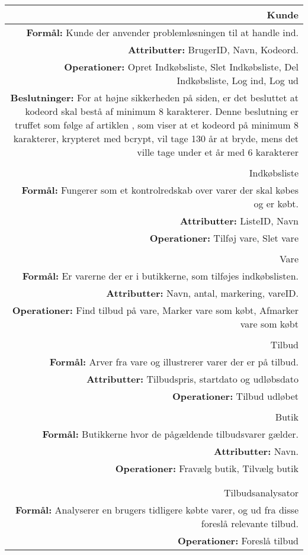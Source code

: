 \begin{table}[H]
\begin{tabularx}{\textwidth}{R}
\hline
Kunde \\ \hline
\textbf{Formål:} Kunde der anvender problemløsningen til at handle ind. \\ 
\textbf{Attributter:} BrugerID, Navn, Kodeord. \\ 
\textbf{Operationer:} Opret Indkøbsliste, Slet Indkøbsliste, Del Indkøbsliste, Log ind, Log ud \\
\textbf{Beslutninger:} For at højne sikkerheden på siden, er det besluttet at kodeord skal bestå af minimum 8 karakterer. Denne beslutning er truffet som følge af artiklen \citep{bcrypt}, som viser at et kodeord på minimum 8 karakterer, krypteret med bcrypt, vil tage 130 år at bryde, mens det ville tage under et år med 6 karakterer \\
\\
\hline
Indkøbsliste \\ \hline
\textbf{Formål:} Fungerer som et kontrolredskab over varer der skal købes og er købt. \\ 
\textbf{Attributter:} ListeID, Navn \\ 
\textbf{Operationer:} Tilføj vare, Slet vare\\

\\
\hline
Vare \\ \hline
\textbf{Formål:} Er varerne der er i butikkerne, som tilføjes indkøbslisten. \\ 
\textbf{Attributter:} Navn, antal, markering, vareID. \\ 
\textbf{Operationer:} Find tilbud på vare, Marker vare som købt, Afmarker vare som købt\\

\\
\hline
Tilbud \\ \hline
\textbf{Formål:} Arver fra vare og illustrerer varer der er på tilbud. \\ 
\textbf{Attributter:} Tilbudspris, startdato og udløbsdato \\ 
\textbf{Operationer:} Tilbud udløbet\\

\\
\hline
Butik \\ \hline
\textbf{Formål:} Butikkerne hvor de pågældende tilbudsvarer gælder. \\ 
\textbf{Attributter:} Navn. \\ 
\textbf{Operationer:} Fravælg butik, Tilvælg butik \\
\\
\\
\hline
Tilbudsanalysator \\ \hline
\textbf{Formål:} Analyserer en brugers tidligere købte varer, og ud fra disse foreslå relevante tilbud. \\ 
\textbf{Operationer:} Foreslå tilbud \\


\end{tabularx}
\end{table}
